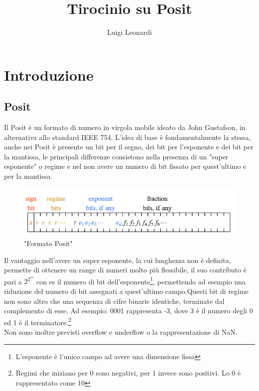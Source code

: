 \documentclass[a4paper,11pt]{article}
\author{Luigi Leonardi}
\title{Tirocinio su Posit}
\date{}
\begin{document}
	\maketitle
	\tableofcontents
	
	

\newpage
	\section{Introduzione}
	\subsection{Posit}

	Il Posit è un formato di numero in virgola mobile ideato da John Gustafson, in alternativa allo standard IEEE 754. L'idea di base è fondamentalmente la stessa, anche nei Posit è presente un bit per il segno, dei bit per l'esponente e dei bit per la mantissa, le principali differenze consistono nella presenza di un "super esponente" o regime e nel non avere un numero di bit fissato per quest'ultimo e per la mantissa. \\
	\begin{figure}[h]
	\includegraphics[scale=0.8]{posit}
	\centering
	\caption{"Formato Posit"}
	\end{figure}Il vantaggio nell'avere un super esponente, la cui lunghezza non è definita, permette di ottenere un range di numeri molto più flessibile, il suo contributo è pari a $2^{2^{es}}$ con es il numero di bit dell'esponente\footnote{L'esponente è l'unico campo ad avere una dimensione fissa}, permettendo ad esempio una riduzione del numero di bit assegnati a quest'ultimo campo.\newline Questi bit di regime non sono altro che una sequenza di cifre binarie identiche, terminate dal complemento di esse. \newline Ad esempio: 0001 rappresenta -3, dove 3 è il numero degli 0 ed 1 è il terminatore.\footnote{Regimi che iniziano per 0 sono negativi, per 1 invece sono positivi. Lo 0 è rappresentato come 10} \\
	Non sono inoltre previsti overflow e underflow o la rappresentazione di NaN.
	
\end{document}
